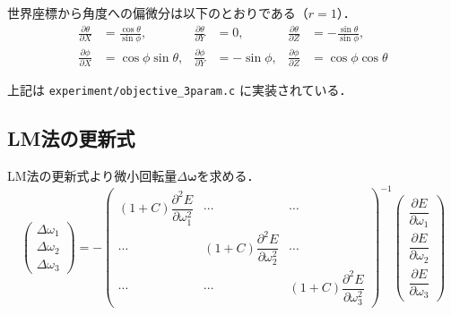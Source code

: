 \documentclass{ltjsarticle}          %
\begin{document}
世界座標から角度への偏微分は以下のとおりである（$r=1$）．
\begin{equation}
  \begin{aligned}
    \frac{\partial \theta}{\partial X} &= \frac{\cos\theta}{\sin\phi}, &
    \frac{\partial \theta}{\partial Y} &= 0, &
    \frac{\partial \theta}{\partial Z} &= -\frac{\sin\theta}{\sin\phi}, \\
    \frac{\partial \phi}{\partial X} &= \cos\phi \sin\theta, &
    \frac{\partial \phi}{\partial Y} &= -\sin\phi, &
    \frac{\partial \phi}{\partial Z} &= \cos\phi \cos\theta
  \end{aligned}
  \label{eq:spherical_derivatives}
\end{equation}

上記は \texttt{experiment/objective\_3param.c} に実装されている．

\subsection{LM法の更新式}
LM法の更新式より微小回転量$\Delta\bm{\omega}$を求める．
\begin{equation}
  \begin{pmatrix}
    \Delta\omega_1 \\ \Delta\omega_2 \\ \Delta\omega_3
  \end{pmatrix}
  = -
  \begin{pmatrix}
    (1 + C)\dfrac{\partial^2 E}{\partial \omega_1^2} & \cdots & \cdots \\
    \cdots & (1 + C)\dfrac{\partial^2 E}{\partial \omega_2^2} & \cdots \\
    \cdots & \cdots & (1 + C)\dfrac{\partial^2 E}{\partial \omega_3^2}
  \end{pmatrix}^{-1}
  \begin{pmatrix}
    \dfrac{\partial E}{\partial \omega_1} \\ \dfrac{\partial E}{\partial \omega_2} \\ \dfrac{\partial E}{\partial \omega_3}
  \end{pmatrix}
  \label{eq:lm_update}
\end{equation}
\end{document}
